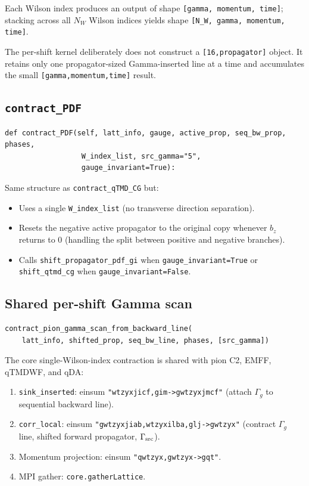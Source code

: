\documentclass[11pt,a4paper]{article}
\begin{document}
Each Wilson index produces an output of shape \texttt{[gamma, momentum, time]};
stacking across all $N_W$ Wilson indices yields shape \texttt{[N\_W, gamma,
momentum, time]}.

The per-shift kernel deliberately does not construct a
\texttt{[16,propagator]} object.  It retains only one propagator-sized
Gamma-inserted line at a time and accumulates the small
\texttt{[gamma,momentum,time]} result.

\subsection{\texttt{contract\_PDF}}

\begin{lstlisting}
def contract_PDF(self, latt_info, gauge, active_prop, seq_bw_prop, phases,
                  W_index_list, src_gamma="5",
                  gauge_invariant=True):
\end{lstlisting}

Same structure as \verb|contract_qTMD_CG| but:
\begin{itemize}[nosep]
  \item Uses a single \texttt{W\_index\_list} (no transverse direction
        separation).
  \item Resets the negative active propagator to the original copy whenever $b_z$
        returns to $0$ (handling the split between positive and negative
        branches).
  \item Calls \verb|shift_propagator_pdf_gi| when
        \texttt{gauge\_invariant=True} or \verb|shift_qtmd_cg| when
        \texttt{gauge\_invariant=False}.
\end{itemize}

\subsection{Shared per-shift Gamma scan}

\begin{lstlisting}
contract_pion_gamma_scan_from_backward_line(
    latt_info, shifted_prop, seq_bw_line, phases, [src_gamma])
\end{lstlisting}

The core single-Wilson-index contraction is shared with pion C2, EMFF,
qTMDWF, and qDA:
\begin{enumerate}[nosep]
  \item \texttt{sink\_inserted}:
        einsum \texttt{"wtzyxjicf,gim->gwtzyxjmcf"}
        (attach $\Gamma_g$ to sequential backward line).
  \item \texttt{corr\_local}:
        einsum \texttt{"gwtzyxjiab,wtzyxilba,glj->gwtzyx"}
        (contract $\Gamma_g$ line, shifted forward propagator, $\Gamma_{\rm
        src}$).
  \item Momentum projection:
        einsum \texttt{"qwtzyx,gwtzyx->gqt"}.
  \item MPI gather: \texttt{core.gatherLattice}.
\end{enumerate}
\end{document}
